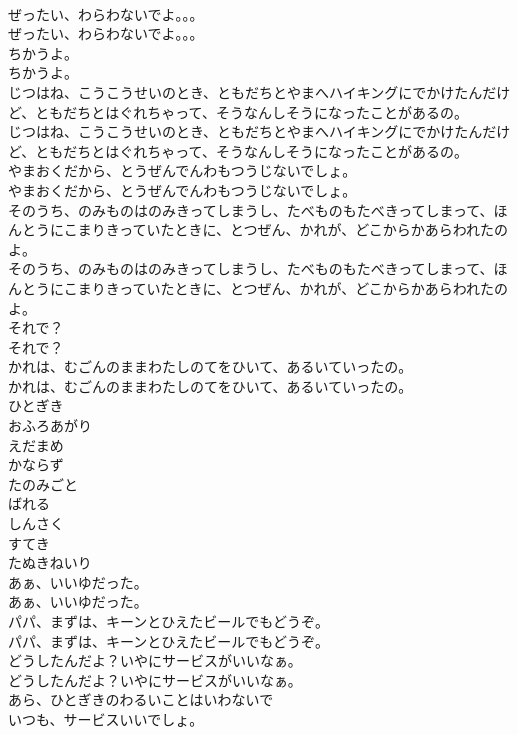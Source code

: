 \documentclass[8pt]{extreport}
\begin{document}
\begin{CJK}{UTF8}{min}
\\	ぜったい、わらわないでよ。。。
\\	ぜったい、わらわないでよ。。。
\\	ちかうよ。
\\	ちかうよ。
\\	じつはね、こうこうせいのとき、ともだちとやまへハイキングにでかけたんだけど、ともだちとはぐれちゃって、そうなんしそうになったことがあるの。
\\	じつはね、こうこうせいのとき、ともだちとやまへハイキングにでかけたんだけど、ともだちとはぐれちゃって、そうなんしそうになったことがあるの。
\\	やまおくだから、とうぜんでんわもつうじないでしょ。
\\	やまおくだから、とうぜんでんわもつうじないでしょ。
\\	そのうち、のみものはのみきってしまうし、たべものもたべきってしまって、ほんとうにこまりきっていたときに、とつぜん、かれが、どこからかあらわれたのよ。
\\	そのうち、のみものはのみきってしまうし、たべものもたべきってしまって、ほんとうにこまりきっていたときに、とつぜん、かれが、どこからかあらわれたのよ。
\\	それで？
\\	それで？
\\	かれは、むごんのままわたしのてをひいて、あるいていったの。
\\	かれは、むごんのままわたしのてをひいて、あるいていったの。
\\	ひとぎき
\\	おふろあがり
\\	えだまめ
\\	かならず
\\	たのみごと
\\	ばれる
\\	しんさく
\\	すてき
\\	たぬきねいり
\\	あぁ、いいゆだった。
\\	あぁ、いいゆだった。
\\	パパ、まずは、キーンとひえたビールでもどうぞ。
\\	パパ、まずは、キーンとひえたビールでもどうぞ。
\\	どうしたんだよ？いやにサービスがいいなぁ。
\\	どうしたんだよ？いやにサービスがいいなぁ。
\\	あら、ひとぎきのわるいことはいわないで
\\	いつも、サービスいいでしょ。

\end{CJK}
\end{document}
